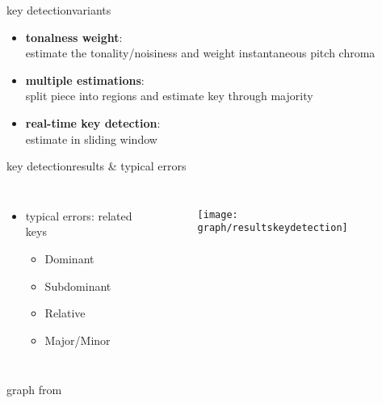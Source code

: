        \begin{frame}{key detection}{variants}
            \begin{itemize}
                \item	\textbf{tonalness weight}:\\ estimate the tonality/noisiness and weight instantaneous pitch chroma
                \bigskip
								\item<2->	\textbf{multiple estimations}:\\ split piece into regions and estimate key through majority
                \bigskip
								\item<3->	\textbf{real-time key detection}:\\ estimate in sliding window
            \end{itemize}
        \end{frame}
        \begin{frame}{key detection}{results \& typical errors}
            \begin{columns}[T]
                \begin{itemize}
                    \item	typical errors: related keys
												\smallskip
                        \begin{itemize}
                            \smallskip
														\item	Dominant
                            \smallskip
														\item	Subdominant
                            \smallskip
														\item	Relative
                            \smallskip
														\item	Major/Minor
                        \end{itemize}
                \end{itemize}
                \begin{figure}
                    \centering
                        \texttt{[image: graph/resultskeydetection]}
                \end{figure}
            \end{columns}
            \begin{flushright}
                graph from 
            \end{flushright}
        \end{frame}
                
